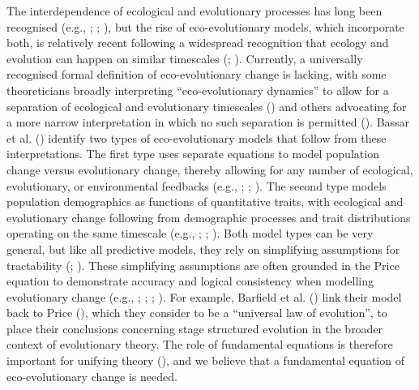 \documentclass[
]{article}
\begin{document}
The interdependence of ecological and evolutionary processes has long
been recognised (e.g., ;
;
), but the rise of
eco-evolutionary models, which incorporate both, is relatively recent
following a widespread recognition that ecology and evolution can happen
on similar timescales (;
). Currently, a
universally recognised formal definition of eco-evolutionary change is
lacking, with some theoreticians broadly interpreting ``eco-evolutionary
dynamics'' to allow for a separation of ecological and evolutionary
timescales () and others
advocating for a more narrow interpretation in which no such separation
is permitted (). Bassar et
al. () identify two types of
eco-evolutionary models that follow from these interpretations. The
first type uses separate equations to model population change versus
evolutionary change, thereby allowing for any number of ecological,
evolutionary, or environmental feedbacks (e.g.,
; ; ). The second type
models population demographics as functions of quantitative traits, with
ecological and evolutionary change following from demographic processes
and trait distributions operating on the same timescale (e.g.,
;
;
). Both model types can be
very general, but like all predictive models, they rely on simplifying
assumptions for tractability (;
). These simplifying assumptions are
often grounded in the Price equation to demonstrate accuracy and logical
consistency when modelling evolutionary change (e.g.,
;
;
;
). For example, Barfield et al.
() link their model back to Price
(), which they consider to be a
``universal law of evolution'', to place their conclusions concerning
stage structured evolution in the broader context of evolutionary
theory. The role of fundamental equations is therefore important for
unifying theory (), and we believe
that a fundamental equation of eco-evolutionary change is needed.
\end{document}
